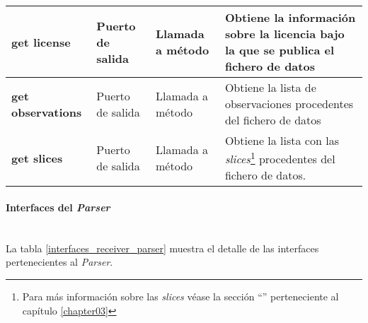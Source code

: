 \begin{longtable}[c]{|p{25mm}|p{20mm}|p{30mm}|p{60mm}|}
   	\textbf{get license} & Puerto de salida & Llamada a método & Obtiene la información sobre la licencia bajo la que se publica el fichero de datos \\
   	\hline
   	
   	\textbf{get observations} & Puerto de salida & Llamada a método & Obtiene la lista de observaciones procedentes del fichero de datos \\
   	\hline
   	
   	\textbf{get slices} & Puerto de salida & Llamada a método & Obtiene la lista con las \textit{slices}\footnote{Para más información sobre las \textit{slices} véase la sección ``\nameref{concept:rdf_data_cube}'' perteneciente al capítulo \ref{chapter03}} procedentes del fichero de datos. \\
   	\hline
\hline
\hline
 
\end{longtable}


\paragraph{Interfaces del \textit{Parser}} \hfill \\
La tabla \ref{interfaces_receiver_parser} muestra el detalle de las interfaces pertenecientes al \textit{Parser}.

